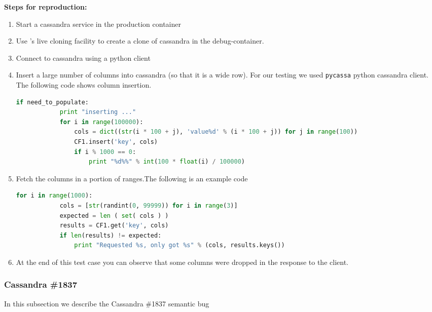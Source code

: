 \noindent \textbf{Steps for reproduction:} \\

\begin{adjustwidth}{0.5cm}{}
	\begin{enumerate}
		\item Start a cassandra service in the production container
		\item Use \parikshan's live cloning facility to create a clone of cassandra in the debug-container.
		\item Connect to cassandra using a python client
		\item Insert a large number of columns into cassandra (so that it is a wide row). For our testing we used \texttt{pycassa} python cassandra client. The following code shows column insertion.
		
		\begin{lstlisting}[language=python]
		if need_to_populate:
			print "inserting ..."
			for i in range(100000):
				cols = dict((str(i * 100 + j), 'value%d' % (i * 100 + j)) for j in range(100))
				CF1.insert('key', cols)
				if i % 1000 == 0:
					print "%d%%" % int(100 * float(i) / 100000)
		\end{lstlisting}
		
		\item Fetch the columns in a portion of ranges.The following is an example code
		
		\begin{lstlisting}[language=python]
		for i in range(1000):
			cols = [str(randint(0, 99999)) for i in range(3)]
			expected = len ( set( cols ) )
			results = CF1.get('key', cols)
			if len(results) != expected:
				print "Requested %s, only got %s" % (cols, results.keys())
		\end{lstlisting}
		
		\item At the end of this test case you can observe that some columns were dropped in the response to the client.
	\end{enumerate}

\end{adjustwidth}

\subsubsection{Cassandra \#1837}

In this subsection we describe the Cassandra \#1837 semantic bug \\

